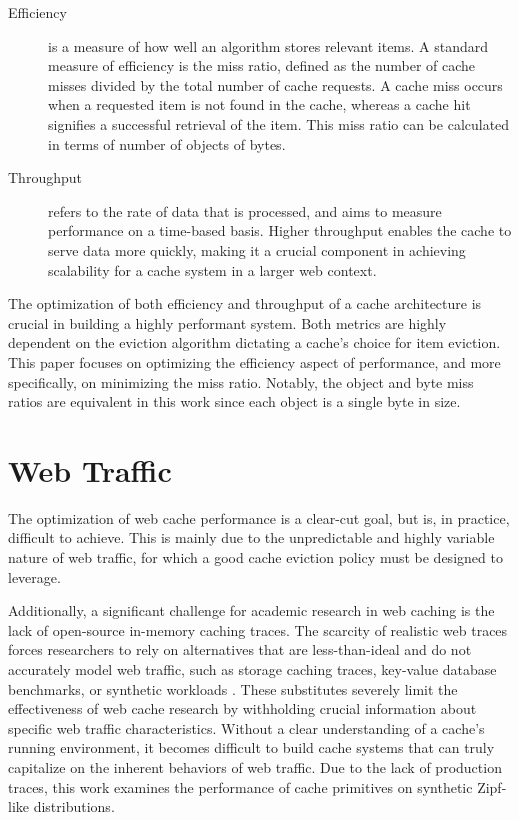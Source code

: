 \begin{description}
    \item[Efficiency] is a measure of how well an algorithm stores relevant items. A standard measure of efficiency is the miss ratio, defined as the number of cache misses divided by the total number of cache requests. A cache miss occurs when a requested item is not found in the cache, whereas a cache hit signifies a successful retrieval of the item. This miss ratio can be calculated in terms of number of objects of bytes.
    
    \item[Throughput] refers to the rate of data that is processed, and aims to measure performance on a time-based basis. Higher throughput enables the cache to serve data more quickly, making it a crucial component in achieving scalability for a cache system in a larger web context.
\end{description}

The optimization of both efficiency and throughput of a cache architecture is crucial in building a highly performant system. Both metrics are highly dependent on the eviction algorithm dictating a cache's choice for item eviction. This paper focuses on optimizing the efficiency aspect of performance, and more specifically, on minimizing the miss ratio. Notably, the object and byte miss ratios are equivalent in this work since each object is a single byte in size.

\section{Web Traffic}

The optimization of web cache performance is a clear-cut goal, but is, in practice, difficult to achieve. This is mainly due to the unpredictable and highly variable nature of web traffic, for which a good cache eviction policy must be designed to leverage.


Additionally, a significant challenge for academic research in web caching is the lack of open-source in-memory caching traces. The scarcity of realistic web traces forces researchers to rely on alternatives that are less-than-ideal and do not accurately model web traffic, such as storage caching traces, key-value database benchmarks, or synthetic workloads \cite{twitter-analysis}. These substitutes severely limit the effectiveness of web cache research by withholding crucial information about specific web traffic characteristics. Without a clear understanding of a cache's running environment, it becomes difficult to build cache systems that can truly capitalize on the inherent behaviors of web traffic. Due to the lack of production traces, this work examines the performance of cache primitives on synthetic Zipf-like distributions.

